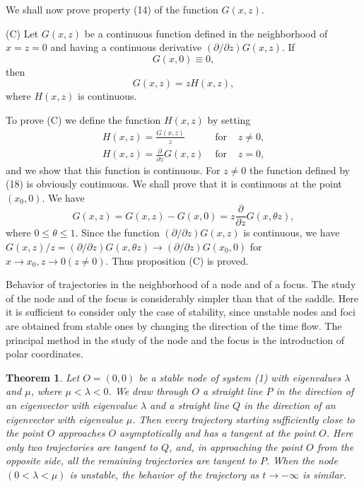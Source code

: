\documentclass[10pt,a5paper]{book}
\makeatletter
\theoremstyle{plain}
\newtheorem{theorem}{Theorem}
\theoremstyle{definition}
\theoremstyle{remark}
\renewenvironment{proof}[1][\proofname]{\par
  \pushQED{\qed}%
  \normalfont\topsep6\p@\@plus6\p@\relax
  \trivlist
  \item\relax{\itshape #1\@addpunct{.}}\hspace\labelsep\ignorespaces
}{\popQED\endtrivlist\@endpefalse}
\makeatother
\begin{document}
\begin{proof}
We shall now prove property (14) of the function $G(x, z)$.

(C) Let $G(x, z)$ be a continuous function defined in the neighborhood of $x=z=0$ and having a continuous derivative $(\partial / \partial z) G(x, z)$. If
\[
G(x, 0) \equiv 0,
\]
then
\[
G(x, z)=z H(x, z),
\]
where $H(x, z)$ is continuous.

To prove (C) we define the function $H(x, z)$ by setting
\[
\begin{array}{lll}
H(x, z)=\frac{G(x, z)}{z} & \text { for } & z \neq 0, \\
H(x, z)=\frac{\partial}{\partial z} G(x, z) & \text { for } & z=0, \tag{18}
\end{array}
\]
and we show that this function is continuous. For $z \neq 0$ the function defined by (18) is obviously continuous. We shall prove that it is continuous at the point $\left(x_{0}, 0\right)$. We have
\[
G(x, z)=G(x, z)-G(x, 0)=z \frac{\partial}{\partial z} G(x, \theta z),
\]
where $0 \leq \theta \leq 1$. Since the function $(\partial / \partial z) G(x, z)$ is continuous, we have $G(x, z) / z=(\partial / \partial z) G(x, \theta z) \rightarrow(\partial / \partial z) G\left(x_{0}, 0\right)$ for $x \rightarrow x_{0}, z \rightarrow 0(z \neq 0)$. Thus proposition (C) is proved.
\end{proof}

Behavior of trajectories in the neighborhood of a node and of a focus. The study of the node and of the focus is considerably simpler than that of
the saddle. Here it is sufficient to consider only the case of stability, since unstable nodes and foci are obtained from stable ones by changing the direction of the time flow. The principal method in the study of the node and the focus is the introduction of polar coordinates.

\begin{theorem}
Let $O=(0,0)$ be a stable node of system (1) with eigenvalues $\lambda$ and $\mu$, where $\mu<\lambda<0$. We draw through $O$ a straight line $P$ in the direction of an eigenvector with eigenvalue $\lambda$ and a straight line $Q$ in the direction of an eigenvector with eigenvalue $\mu$. Then every trajectory starting sufficiently close to the point $O$ approaches $O$ asymptotically and has a tangent at the point $O$. Here only two trajectories are tangent to $Q$, and, in approaching the point $O$ from the opposite side, all the remaining trajectories are tangent to $P$. When the node $(0<\lambda<\mu)$ is unstable, the behavior of the trajectory as $t \rightarrow-\infty$ is similar.
\end{theorem}
\end{document}
